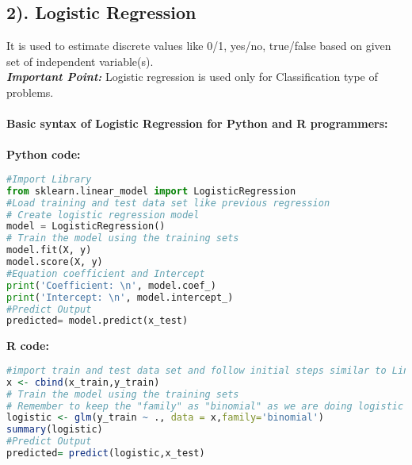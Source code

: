\documentclass[Proceedings]{ascelike}
\begin{document}
\subsection{2). Logistic Regression}
 It is used to estimate discrete values like 0/1, yes/no, true/false  based on given set of independent variable(s).\\ 
\textbf{\textit{Important Point:}} Logistic regression is used only for Classification type of problems.\\\\ 
\textbf{Basic syntax of Logistic Regression for Python and R programmers:}\\
\\\textbf{Python code:}
\begin{lstlisting}[language=Python]
#Import Library
from sklearn.linear_model import LogisticRegression
#Load training and test data set like previous regression
# Create logistic regression model
model = LogisticRegression()
# Train the model using the training sets
model.fit(X, y)
model.score(X, y)
#Equation coefficient and Intercept
print('Coefficient: \n', model.coef_)
print('Intercept: \n', model.intercept_)
#Predict Output
predicted= model.predict(x_test)

\end{lstlisting}
\textbf{R code:}
\begin{lstlisting}[language=R]
#import train and test data set and follow initial steps similar to Linear regression.
x <- cbind(x_train,y_train)
# Train the model using the training sets
# Remember to keep the "family" as "binomial" as we are doing logistic regression! 
logistic <- glm(y_train ~ ., data = x,family='binomial')
summary(logistic)
#Predict Output
predicted= predict(logistic,x_test)
\end{lstlisting}
\end{document}
